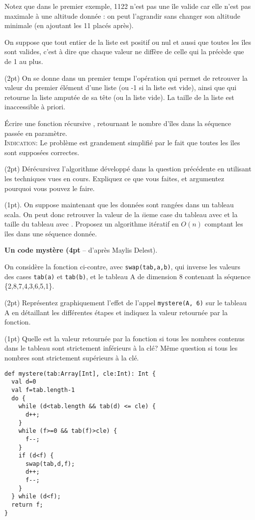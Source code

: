 \documentclass[10pt]{article}\usepackage[correction,nu]{esial}
\begin{document}
Notez que dans le premier exemple, 1122 n'est pas une île valide car
elle n'est pas maximale à une altitude donnée : on peut l'agrandir
sans changer son altitude minimale (en ajoutant les 11 placés après).

On suppose que tout entier de la liste est positif ou nul et aussi que toutes
les îles sont valides, c'est à dire que chaque valeur ne diffère de celle qui la
précède que de 1 au plus.

\Question(2pt)
On se donne dans un premier temps l'opération  qui
permet de retrouver la valeur du premier élément d'une liste (ou -1 si la liste
est vide), ainsi que  qui retourne la liste
amputée de sa tête (ou la liste vide). La taille de la liste est inaccessible à
priori.

Écrire une fonction récursive , retournant le
nombre d'îles dans la séquence passée en paramètre.\\
\textsc{Indication:} Le problème est grandement simplifié par le fait que toutes
les îles sont supposées correctes.

\Question(2pt)
Dérécursivez l'algorithme développé dans la question précédente en utilisant les
techniques vues en cours. Expliquez ce que vous faites, et argumentez pourquoi
vous pouvez le faire.

\Question(1pt).  On suppose maintenant que les données sont rangées dans un
tableau scala. On peut donc retrouver la valeur de la $i$ieme case du tableau
 avec  et la taille du tableau avec
.
%
Proposez un algorithme itératif en $O(n)$ comptant les îles dans une séquence
donnée.

\medskip
\Exercice\textbf{Un code mystère {\rm(}4pt} -- d'après Maylis Delest).\smallskip

\noindent\begin{minipage}{.54\linewidth}
On considère la fonction ci-contre, avec
\texttt{swap(tab,a,b)}, qui inverse les valeurs des cases \texttt{tab(a)} et
\texttt{tab(b)}, et le tableau A de dimension 8 contenant la séquence \{2,8,7,4,3,6,5,1\}.

\Question(2pt) Représentez graphiquement l'effet de l'appel \texttt{mystere(A,
  6)} sur le tableau A en détaillant les différentes étapes et indiquez la
valeur retournée par la fonction.

\Question(1pt) Quelle est la valeur retournée par la fonction si tous les
nombres contenus dans le tableau sont strictement inférieurs à la clé? Même
question si tous les nombres sont strictement supérieurs à la clé.
\end{minipage}\hfill\begin{minipage}{.44\linewidth}
\begin{Verbatim}[numbers=right]
def mystere(tab:Array[Int], cle:Int): Int {
  val d=0
  val f=tab.length-1
  do {
    while (d<tab.length && tab(d) <= cle) {
      d++;
    }
    while (f>=0 && tab(f)>cle) {
      f--;
    }
    if (d<f) {
      swap(tab,d,f);
      d++;
      f--;
    }
  } while (d<f);
  return f;
}
\end{Verbatim}
\end{minipage}
\end{document}
